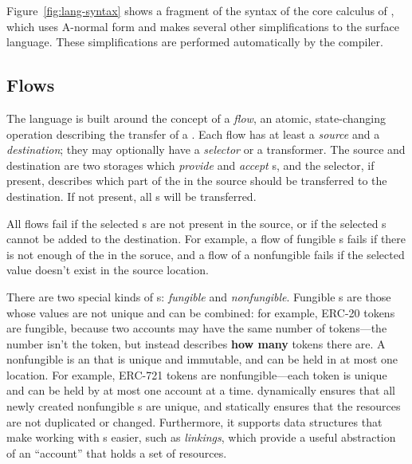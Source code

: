 \documentclass[sigconf]{acmart}
\begin{document}
Figure~\ref{fig:lang-syntax} shows a fragment of the syntax of the core calculus of \langName, which uses A-normal form  and makes several other simplifications to the surface \langName language.
These simplifications are performed automatically by the compiler.

\subsection{Flows}
The \langName language is built around the concept of a \emph{flow}, an atomic, state-changing operation describing the transfer of a \assetTxt.
Each flow has at least a \emph{source} and a \emph{destination}; they may optionally have a \emph{selector} or a transformer.
The source and destination are two storages which \emph{provide} and \emph{accept} \assetTxt{}s, and the selector, if present, describes which part of the \assetTxt in the source should be transferred to the destination.
If not present, all \assetTxt{}s will be transferred.

All flows fail if the selected \assetTxt{}s are not present in the source, or if the selected \assetTxt{}s cannot be added to the destination.
For example, a flow of fungible \assetTxt{}s fails if there is not enough of the \assetTxt in the soruce, and a flow of a nonfungible \assetTxt fails if the selected value doesn't exist in the source location.

There are two special kinds of \assetTxt{}s: \emph{fungible} and \emph{nonfungible}.
Fungible \assetTxt{}s are those whose values are not unique and can be combined: for example, ERC-20 tokens are fungible, because two accounts may have the same number of tokens---the number isn't the token, but instead describes \textbf{how many} tokens there are.
A nonfungible \assetTxt is an \assetTxt that is unique and immutable, and can be held in at most one location.
For example, ERC-721  tokens are nonfungible---each token is unique and can be held by at most one account at a time.
\langName dynamically ensures that all newly created nonfungible \assetTxt{}s are unique, and statically ensures that the resources are not duplicated or changed.
Furthermore, it supports data structures that make working with \assetTxt{}s easier, such as \emph{linkings}, which provide a useful abstraction of an ``account'' that holds a set of resources.
\end{document}
